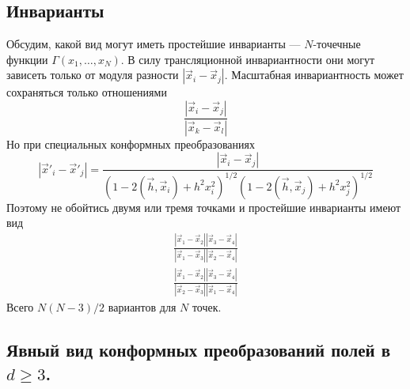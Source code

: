 \documentclass[a4paper,12pt]{article}
\theoremstyle{definition}
\theoremstyle{definition}
\theoremstyle{definition}
\begin{document}
\subsection{Инварианты}
\label{sec:invariants}

Обсудим, какой вид могут иметь простейшие инварианты --- $N$-точечные функции
$\Gamma(x_1,\dots,x_N)$. В силу трансляционной инвариантности они могут зависеть только от модуля
разности $|\vec x_i-\vec x_j|$.  Масштабная инвариантность может сохраняться только отношениями 
\begin{equation}
  \label{eq:173}
  \frac{|\vec x_i-\vec x_j|}{|\vec x_k -\vec x_l|}
\end{equation}
Но при специальных конформных преобразованиях
\begin{equation}
  \label{eq:174}
  |\vec x'_i-\vec x'_j|=\frac{|\vec x_i-\vec x_j|}{(1-2(\vec h,\vec x_i)+h^2x_i^2)^{1/2} (1-2(\vec h,\vec x_j)+h^2 x_j^2)^{1/2}}
\end{equation}
Поэтому не обойтись двумя или тремя точками и простейшие инварианты имеют вид
\begin{eqnarray}
  \label{eq:175}
  \frac{|\vec x_1-\vec x_2||\vec x_3-\vec x_4|}{|\vec x_1-\vec x_3||\vec x_{2}-\vec x_{4}|}\\
  \frac{|\vec x_1-\vec x_2||\vec x_3-\vec x_4|}{|\vec x_2-\vec x_3||\vec x_{1}-\vec x_{4}|}
\end{eqnarray}
Всего $N(N-3)/2$ вариантов для $N$ точек.

\subsection{Явный вид конформных преобразований полей в $d\geq 3$.}
\label{sec:conformal-transforms-explicit}
\end{document}
